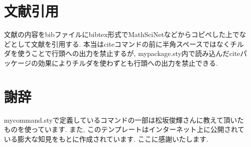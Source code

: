 \documentclass[11pt,a4paper,oneside,lualatex]{ltjsarticle} %
\begin{document}

\section{文献引用} \label{sec:bib}


文献の内容をbibファイルにbibtex形式でMathSciNetなどからコピペした上で\cite[定理 1.1]{AM}などとして文献を引用する.
本当はciteコマンドの前に半角スペースではなくチルダを使うことで行頭への出力を禁止するが, mypackage.sty内で読み込んだciteパッケージの効果によりチルダを使わずとも行頭への出力を禁止できる.


\section*{謝辞}


mycommand.styで定義しているコマンドの一部は松坂俊輝さんに教えて頂いたものを使っています.
また, このテンプレートはインターネット上に公開されている膨大な知見をもとに作成されています.
ここに感謝いたします.




\end{document}
